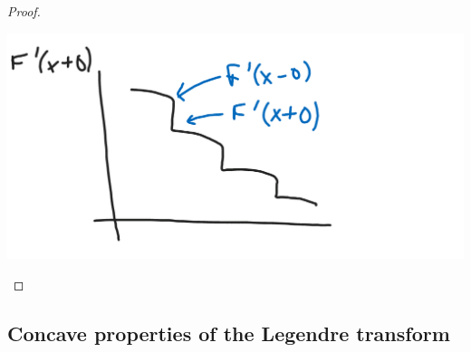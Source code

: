 \begin{proof}
\begin{center}\includegraphics[scale=.25]{images/2-2}\end{center}
\end{proof}

\subsection{Concave properties of the Legendre transform}

